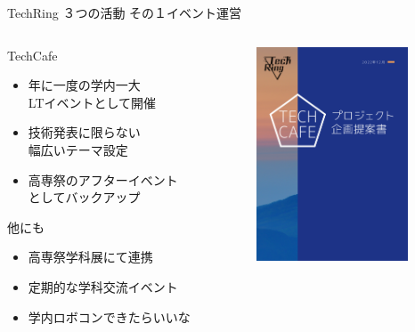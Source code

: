 \documentclass[dvipdfmx]{beamer}
\begin{document}
\begin{frame}{TechRing ３つの活動 その１}{イベント運営}
  \begin{columns}
    \begin{column}{0.55\textwidth}
      \begin{alertblock}{TechCafe}
        \begin{itemize}
          \item 年に一度の学内一大\\LTイベントとして開催
          \item 技術発表に限らない\\幅広いテーマ設定
          \item 高専祭のアフターイベント\\としてバックアップ
        \end{itemize}
      \end{alertblock}

      \begin{block}{他にも}
        \begin{footnotesize}
          \begin{itemize}
            \item 高専祭学科展にて連携
            \item 定期的な学科交流イベント
            \item 学内ロボコンできたらいいな
          \end{itemize}
        \end{footnotesize}
      \end{block}
    \end{column}

    \begin{column}{0.4\textwidth}
      \includegraphics[width=4.5cm]{pic/TechCafe.png}
    \end{column}
  \end{columns}
\end{frame}
\end{document}

